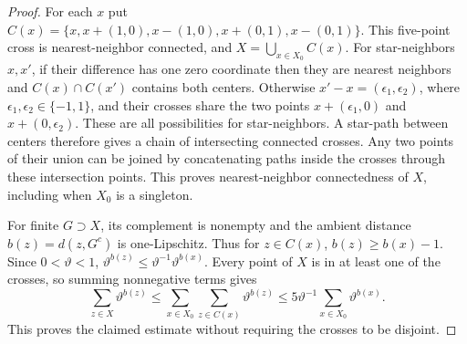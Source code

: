 \begin{proof}
For each \(x\) put
\(C(x)=\{x,x+(1,0),x-(1,0),x+(0,1),x-(0,1)\}\).
This five-point cross is nearest-neighbor connected,
and \(X=\bigcup_{x\in X_0}C(x)\).
For star-neighbors \(x,x'\), if their difference has
one zero coordinate then they are nearest neighbors
and \(C(x)\cap C(x')\) contains both centers.
Otherwise \(x'-x=(\epsilon_1,\epsilon_2)\), where
\(\epsilon_1,\epsilon_2\in\{-1,1\}\), and their crosses
share the two points \(x+(\epsilon_1,0)\) and
\(x+(0,\epsilon_2)\).  These are all possibilities for
star-neighbors.  A star-path between centers therefore
gives a chain of intersecting connected crosses.  Any
two points of their union can be joined by concatenating
paths inside the crosses through these intersection
points.  This proves nearest-neighbor connectedness
of \(X\), including when \(X_0\) is a singleton.

For finite \(G\supset X\), its complement is nonempty
and the ambient distance \(b(z)=d(z,G^c)\) is
one-Lipschitz.  Thus for \(z\in C(x)\),
\(b(z)\ge b(x)-1\).  Since \(0<\vartheta<1\),
\(\vartheta^{b(z)}\le\vartheta^{-1}\vartheta^{b(x)}\).
Every point of \(X\) is in at least one of the crosses,
so summing nonnegative terms gives
\[
 \sum_{z\in X}\vartheta^{b(z)}
    \le\sum_{x\in X_0}\sum_{z\in C(x)}\vartheta^{b(z)}
    \le5\vartheta^{-1}\sum_{x\in X_0}\vartheta^{b(x)}.
\]
This proves the claimed estimate without requiring
the crosses to be disjoint.
\end{proof}
